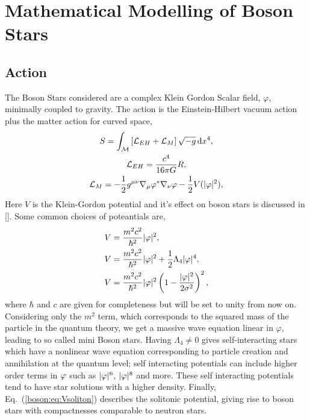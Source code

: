 





\section{Mathematical Modelling of Boson Stars}
\subsection{Action} \label{boson:sec:action}
The Boson Stars considered are a complex Klein Gordon Scalar field, $\varphi$, minimally coupled to gravity. The action is the Einstein-Hilbert vacuum action plus the matter action for curved space,
\begin{gather} S = \int_\mathcal{M}\left[\mathcal{L}_{EH} + \mathcal{L}_M\right] \sqrt{-g}\,\dd x^4, \\
 \mathcal{L}_{EH} = \frac{c^4}{16\pi G}R, \\
 \mathcal{L}_{M} =-\frac{1}{2}g^{\mu\nu}\nabla_\mu \varphi^* \nabla_\nu \varphi - \frac{1}{2}V(|\varphi|^2),  \end{gather}
Here $V$ is the Klein-Gordon potential and it's effect on boson stars is discussed in []. Some common choices of poteantials are,
\begin{align}
V &= \frac{m^2 c^2}{\hbar^2 }|\varphi|^2,\label{boson:eq:Vmini} \\
V &= \frac{m^2 c^2}{\hbar^2 }|\varphi|^2 + \frac{1}{2}\Lambda_4|\varphi|^4 ,\\
V &= \frac{m^2 c^2}{\hbar^2 }|\varphi|^2\left(1-\frac{|\varphi|^2}{2\sigma^2}\right)^2 , \label{boson:eq:Vsoliton}
\end{align}
where $\hbar$ and $c$ are given for completeness but will be set to unity from now on.
Considering only the $m^2$ term, which corresponds to the squared mass of the particle in the quantum theory, we get a massive wave equation linear in $\varphi$, leading to so called mini Boson stars. Having $\Lambda_4\neq0$ gives self-interacting stars which have a nonlinear wave equation corresponding to particle creation and annihilation at the quantum level; self interacting potentials can include higher order terms in $\varphi$ such as $|\varphi|^6$, $|\varphi|^8$ and more. These self interacting potentials tend to have star solutions with a higher density. Finally, Eq.~(\ref{boson:eq:Vsoliton}) describes the solitonic potential, giving rise to boson stars with compactnesses comparable to neutron stars. 

